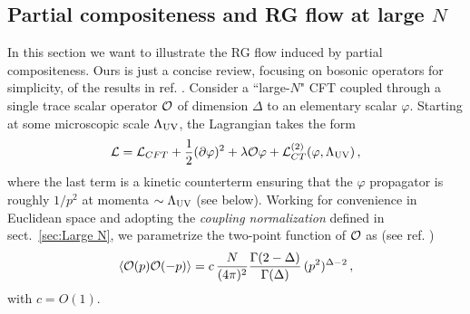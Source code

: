\documentclass[a4paper,12pt]{article}
\newcommand{\beq}{\begin{equation}}
\newcommand{\eeq}{\end{equation}}
\def\sec#1{sect.~\ref{#1}}
\def\LUV{\Lambda_{\rm UV}}
\begin{document}
\boldmath
\subsection{Partial compositeness and RG flow at large $N$}
\unboldmath
\label{ToyPartialComp}
In this section we want to illustrate the RG flow induced by partial compositeness.
Ours is just a concise review, focusing on bosonic operators for simplicity, of the results in ref. \cite{Contino:2004vy}.
Consider a ``large-$N$" CFT coupled through a single trace scalar operator ${\cal O}$ of dimension $\Delta$ to an elementary scalar $\varphi$.
Starting at some microscopic scale  $\LUV$, the Lagrangian takes the form
\beq
{\cal L}={\cal L}_{CFT}+\frac{1}{2}(\partial \varphi)^2+\lambda {\cal O}\varphi+{\cal L}^{(2)}_{CT}(\varphi,\LUV)\,,
\eeq
where the last term is a  kinetic counterterm  ensuring that the $\varphi$ propagator is roughly $1/p^2$  at momenta $\sim \LUV$ (see below). 
Working for convenience in Euclidean space and adopting the {\it {coupling normalization}} defined in \sec{sec:Large N}, we parametrize the two-point function of ${\cal O}$ as (see ref. \cite{Grinstein:2008qk})
\beq
\langle {\cal O}(p){\cal O}(-p)\rangle = c\, \frac{N}{(4\pi)^2}\frac{\Gamma(2-\Delta)}{\Gamma(\Delta)}\, (p^2)^{\Delta-2}\,,\eeq
with $c=O(1)$.
\end{document}
